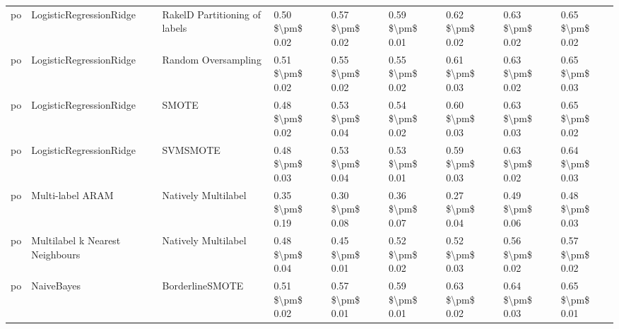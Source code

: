 \begin{tabular}{lllllllll}
      po &         LogisticRegressionRidge & RakelD Partitioning of labels & 0.50 \$\textbackslash pm\$ 0.02 &           0.57 \$\textbackslash pm\$ 0.02 &       0.59 \$\textbackslash pm\$ 0.01 &        0.62 \$\textbackslash pm\$ 0.02 &                         0.63 \$\textbackslash pm\$ 0.02 &     0.65 \$\textbackslash pm\$ 0.02 \\
      po &         LogisticRegressionRidge &           Random Oversampling & 0.51 \$\textbackslash pm\$ 0.02 &           0.55 \$\textbackslash pm\$ 0.02 &       0.55 \$\textbackslash pm\$ 0.02 &        0.61 \$\textbackslash pm\$ 0.03 &                         0.63 \$\textbackslash pm\$ 0.02 &     0.65 \$\textbackslash pm\$ 0.03 \\
      po &         LogisticRegressionRidge &                         SMOTE & 0.48 \$\textbackslash pm\$ 0.02 &           0.53 \$\textbackslash pm\$ 0.04 &       0.54 \$\textbackslash pm\$ 0.02 &        0.60 \$\textbackslash pm\$ 0.03 &                         0.63 \$\textbackslash pm\$ 0.03 &     0.65 \$\textbackslash pm\$ 0.02 \\
      po &         LogisticRegressionRidge &                      SVMSMOTE & 0.48 \$\textbackslash pm\$ 0.03 &           0.53 \$\textbackslash pm\$ 0.04 &       0.53 \$\textbackslash pm\$ 0.01 &        0.59 \$\textbackslash pm\$ 0.03 &                         0.63 \$\textbackslash pm\$ 0.02 &     0.64 \$\textbackslash pm\$ 0.03 \\
      po &                Multi-label ARAM &           Natively Multilabel & 0.35 \$\textbackslash pm\$ 0.19 &           0.30 \$\textbackslash pm\$ 0.08 &       0.36 \$\textbackslash pm\$ 0.07 &        0.27 \$\textbackslash pm\$ 0.04 &                         0.49 \$\textbackslash pm\$ 0.06 &     0.48 \$\textbackslash pm\$ 0.03 \\
      po & Multilabel k Nearest Neighbours &           Natively Multilabel & 0.48 \$\textbackslash pm\$ 0.04 &           0.45 \$\textbackslash pm\$ 0.01 &       0.52 \$\textbackslash pm\$ 0.02 &        0.52 \$\textbackslash pm\$ 0.03 &                         0.56 \$\textbackslash pm\$ 0.02 &     0.57 \$\textbackslash pm\$ 0.02 \\
      po &                      NaiveBayes &               BorderlineSMOTE & 0.51 \$\textbackslash pm\$ 0.02 &           0.57 \$\textbackslash pm\$ 0.01 &       0.59 \$\textbackslash pm\$ 0.01 &        0.63 \$\textbackslash pm\$ 0.02 &                         0.64 \$\textbackslash pm\$ 0.03 &     0.65 \$\textbackslash pm\$ 0.01 \\

\end{tabular}
